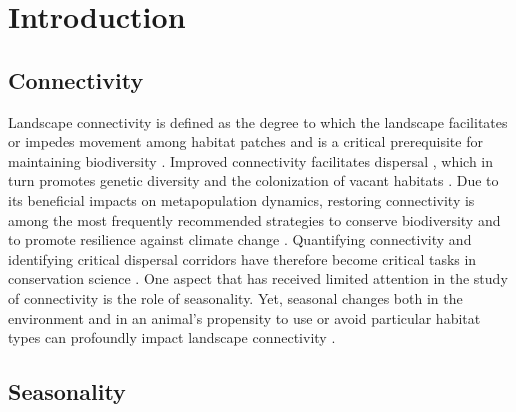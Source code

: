 \documentclass[abstract=on,10pt,a4paper,bibliography=totocnumbered]{article}
\begin{document}
\newpage

\onehalfspacing
\tableofcontents
\doublespacing

\newpage
{}

\linenumbers
\section{Introduction}
\subsection{Connectivity}

Landscape connectivity is defined as the degree to which the landscape
facilitates or impedes movement among habitat patches \citep{Taylor.1993} and is
a critical prerequisite for maintaining biodiversity \citep{Fahrig.2003}.
Improved connectivity facilitates dispersal \citep{Doerr.2011, Baguette.2013},
which in turn promotes genetic diversity \citep{Perrin.2000, Frankham.2002} and
the colonization of vacant habitats \citep{Hanski.1999, MacArthur.2001}. Due to
its beneficial impacts on metapopulation dynamics, restoring connectivity is
among the most frequently recommended strategies to conserve biodiversity and to
promote resilience against climate change \citep{Heller.2009, Rudnick.2012}.
Quantifying connectivity and identifying critical dispersal corridors have
therefore become critical tasks in conservation science \citep{Heller.2009,
Rudnick.2012, Keeley.2019, Hofmann.2021}. One aspect that has received limited
attention in the study of connectivity is the role of seasonality. Yet, seasonal
changes both in the environment and in an animal's propensity to use or avoid
particular habitat types can profoundly impact landscape connectivity
\citep{Zeller.2020a}.

\subsection{Seasonality}
\end{document}
